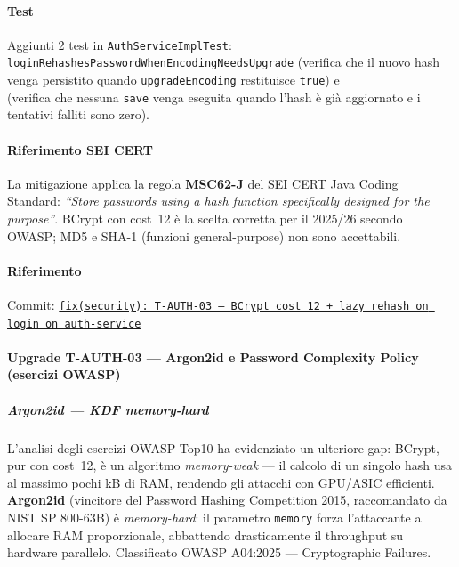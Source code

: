 ﻿\documentclass[a4paper,12pt]{report}
\newcommand{\commitref}[2]{\texttt{\small \href{https://github.com/diegoandruccioli/hotel-pms/commit/#1}{#2}}}
\begin{document}
\paragraph{Test} Aggiunti 2 test in \texttt{AuthServiceImplTest}: \\
\texttt{loginRehashesPasswordWhenEncodingNeedsUpgrade} (verifica che il nuovo hash venga
persistito quando \texttt{upgradeEncoding} restituisce \texttt{true}) e\\
\texttt{} (verifica che nessuna \texttt{save}
venga eseguita quando l'hash è già aggiornato e i tentativi falliti sono zero).

\paragraph{Riferimento SEI CERT} La mitigazione applica la regola \textbf{MSC62-J} del SEI CERT Java Coding Standard: \emph{``Store passwords using a hash function specifically designed for the purpose''}. BCrypt con cost~12 è la scelta corretta per il 2025/26 secondo OWASP; MD5 e SHA-1 (funzioni general-purpose) non sono accettabili.

\paragraph{Riferimento} Commit: \commitref{4e1f1e9}{fix(security): T-AUTH-03 — BCrypt cost 12 + lazy rehash on login on auth-service}

\paragraph{Upgrade T-AUTH-03 — Argon2id e Password Complexity Policy (esercizi OWASP)}

\subparagraph{Argon2id — KDF memory-hard}
L'analisi degli esercizi OWASP Top10 ha evidenziato un ulteriore gap: BCrypt, pur con
cost~12, è un algoritmo \textit{memory-weak} — il calcolo di un singolo hash usa al
massimo pochi kB di RAM, rendendo gli attacchi con GPU/ASIC efficienti.
\textbf{Argon2id} (vincitore del Password Hashing Competition 2015, raccomandato da
NIST SP 800-63B) è \textit{memory-hard}: il parametro \texttt{memory} forza l'attaccante
a allocare RAM proporzionale, abbattendo drasticamente il throughput su hardware
parallelo. Classificato OWASP A04:2025 --- Cryptographic Failures.
\end{document}
